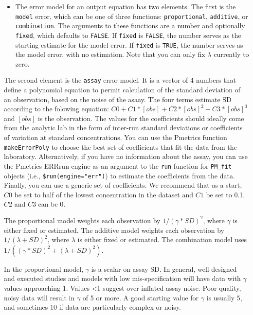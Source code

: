 \documentclass[
]{book}
\providecommand{\tightlist}{%
  \setlength{\itemsep}{0pt}\setlength{\parskip}{0pt}}
\begin{document}
\begin{itemize}
\tightlist
\item
  The error model for an output equation has two elements. The first is the \texttt{model} error, which can be one of three functions: \texttt{proportional}, \texttt{additive}, or \texttt{combination}. The arguments to these functions are a number and optionally \texttt{fixed}, which defaults to \texttt{FALSE}. If \texttt{fixed} is \texttt{FALSE}, the number serves as the starting estimate for the model error. If \texttt{fixed} is \texttt{TRUE}, the number serves as the model error, with no estimation. Note that you can only fix \(\lambda\) currently to zero.
\end{itemize}

The second element is the \texttt{assay} error model. It is a vector of 4 numbers that define a polynomial equation to permit calculation of the standard deviation of an observation, based on the noise of the asaay. The four terms estimate SD according to the folowing equation: \(C0 + C1 * [obs] + C2 * [obs]^2 + C3 * [obs]^3\) and \([obs]\) is the observation. The values for the coefficients should ideally come from the analytic lab in the form of inter-run standard deviations or coefficients of variation at standard concentrations. You can use the Pmetrics function \texttt{makeErrorPoly} to choose the best set of coefficients that fit the data from the
laboratory. Alternatively, if you have no information about the assay,
you can use the Pmetrics ERRrun engine as an argument to the \texttt{run} function for \texttt{PM\_fit} objects (i.e., \texttt{\$run(engine="err")}) to estimate the coefficients
from the data. Finally, you can use a generic set of coefficients. We
recommend that as a start, \(C0\) be set to half of the lowest
concentration in the dataset and \(C1\) be set to 0.1. \(C2\) and \(C3\) can
be 0.

The proportional model weights each observation by \(1/(\gamma * SD)^2\), where \(\gamma\) is either fixed or estimated. The additive model weights each observation by \(1/(\lambda + SD)^2\), where \(\lambda\) is either fixed or estimated. The combination model uses \(1/((\gamma * SD)^2 + (\lambda + SD)^2)\).

In the proportional model, \(\gamma\) is a scalar on assay SD. In general,
well-designed and executed studies and models with low mis-specification will have data with \(\gamma\) values approaching 1. Values \textless1 suggest over inflated assay noise. Poor quality, noisy data will result in \(\gamma\) of 5 or more. A good starting value for \(\gamma\) is usually 5, and sometimes 10 if data are particularly complex or noisy.
\end{document}
